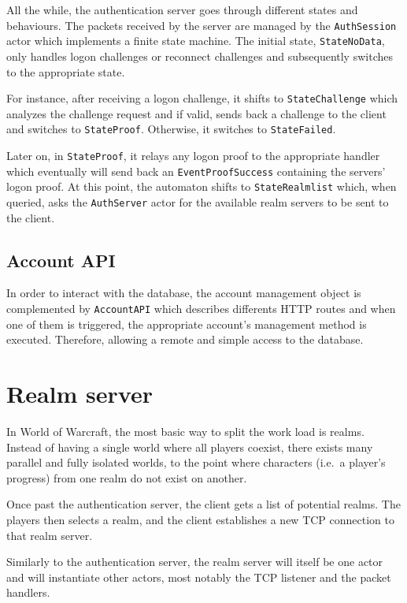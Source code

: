 \documentclass[paper=a4, fontsize=11pt]{scrartcl}
\begin{document}
All the while, the authentication server goes through different states and
behaviours. The packets received by the server are managed by the
\texttt{AuthSession} actor which implements a finite state machine.
The initial state, \texttt{StateNoData}, only handles logon challenges or
reconnect challenges and subsequently switches to the appropriate state.

For instance, after receiving a logon challenge, it shifts
to \texttt{StateChallenge} which analyzes the challenge request and if valid, 
sends back a challenge to the client and switches to \texttt{StateProof}. 
Otherwise, it switches to \texttt{StateFailed}.

Later on, in \texttt{StateProof}, it relays any logon proof to the appropriate
handler which eventually will send back an \texttt{EventProofSuccess} containing
the servers' logon proof.
At this point, the automaton shifts to \texttt{StateRealmlist} which, when
queried, asks the \texttt{AuthServer} actor for the available realm servers to
be sent to the client.

\subsection{Account API}

In order to interact with the database, the account management object is 
complemented by \texttt{AccountAPI} which describes differents HTTP routes 
and when one of them is triggered, the appropriate account's management method is
executed. Therefore, allowing a remote and simple access to the database.

\section{Realm server}

In World of Warcraft, the most basic way to split the work load is
realms.
Instead of having a single world where all players coexist, there exists many
parallel and fully isolated worlds, to the point where characters (i.e.\ a
player's progress) from one realm do not exist on another.

Once past the authentication server, the client gets a list of potential realms.
The players then selects a realm, and the client establishes a new TCP
connection to that realm server.

Similarly to the authentication server, the realm server will itself be one
actor and will instantiate other actors, most notably the TCP listener and the
packet handlers.
\end{document}
